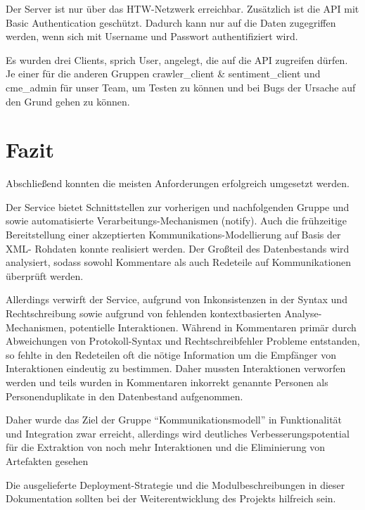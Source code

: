 Der Server ist nur über das HTW-Netzwerk erreichbar. Zusätzlich ist die API mit
Basic Authentication geschützt. Dadurch kann nur auf die Daten zugegriffen
werden, wenn sich mit Username und Passwort authentifiziert wird.

Es wurden drei Clients, sprich User, angelegt, die auf die API zugreifen
dürfen. Je einer für die anderen Gruppen crawler\_client \& sentiment\_client und
cme\_admin für unser Team, um Testen zu können und bei Bugs der Ursache auf den
Grund gehen zu können.

\section{Fazit}\label{sec:03_05_fazit}

Abschließend konnten die meisten Anforderungen erfolgreich umgesetzt werden.

Der Service bietet Schnittstellen zur vorherigen und nachfolgenden Gruppe und
sowie automatisierte Verarbeitungs-Mechanismen (notify). Auch die frühzeitige
Bereitstellung einer akzeptierten Kommunikations-Modellierung auf Basis der XML-
Rohdaten konnte realisiert werden. Der Großteil des Datenbestands wird
analysiert, sodass sowohl Kommentare als auch Redeteile auf Kommunikationen
überprüft werden.

Allerdings verwirft der Service, aufgrund von Inkonsistenzen in der Syntax und
Rechtschreibung sowie aufgrund von fehlenden kontextbasierten Analyse-
Mechanismen, potentielle Interaktionen. Während in Kommentaren primär durch
Abweichungen von Protokoll-Syntax und Rechtschreibfehler Probleme entstanden,
so fehlte in den Redeteilen oft die nötige Information um die Empfänger von
Interaktionen eindeutig zu bestimmen. Daher mussten Interaktionen verworfen
werden und teils wurden in Kommentaren inkorrekt genannte Personen als
Personenduplikate in den Datenbestand aufgenommen.

Daher wurde das Ziel der Gruppe \enquote{Kommunikationsmodell} in Funktionalität und
Integration zwar erreicht, allerdings wird deutliches Verbesserungspotential
für die Extraktion von noch mehr Interaktionen und die Eliminierung von
Artefakten gesehen

Die ausgelieferte Deployment-Strategie und die Modulbeschreibungen in dieser
Dokumentation sollten bei der Weiterentwicklung des Projekts hilfreich sein.